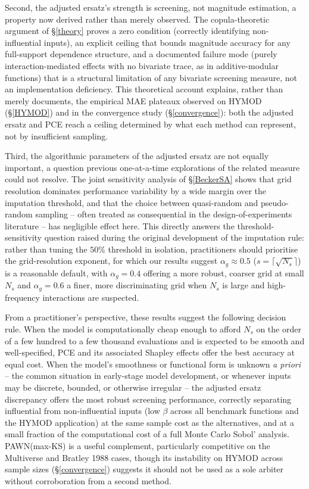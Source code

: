 \documentclass[12pt]{article}
\begin{document}
Second, the adjusted ersatz's strength is screening, not magnitude estimation, a property now derived rather than merely observed. The copula-theoretic argument of \S\ref{theory} proves a zero condition (correctly identifying non-influential inputs), an explicit ceiling that bounds magnitude accuracy for any full-support dependence structure, and a documented failure mode (purely interaction-mediated effects with no bivariate trace, as in additive-modular functions) that is a structural limitation of any bivariate screening measure, not an implementation deficiency. This theoretical account explains, rather than merely documents, the empirical MAE plateaux observed on HYMOD (\S\ref{HYMOD}) and in the convergence study (\S\ref{convergence}): both the adjusted ersatz and PCE reach a ceiling determined by what each method can represent, not by insufficient sampling.

Third, the algorithmic parameters of the adjusted ersatz are not equally important, a question previous one-at-a-time explorations of the related measure could not resolve. The joint sensitivity analysis of \S\ref{BeckerSA} shows that grid resolution dominates performance variability by a wide margin over the imputation threshold, and that the choice between quasi-random and pseudo-random sampling -- often treated as consequential in the design-of-experiments literature -- has negligible effect here. This directly answers the threshold-sensitivity question raised during the original development of the imputation rule: rather than tuning the $50\%$ threshold in isolation, practitioners should prioritise the grid-resolution exponent, for which our results suggest $\alpha_g\approx0.5$ ($s=\lceil\sqrt{N_s}\rceil$) is a reasonable default, with $\alpha_g=0.4$ offering a more robust, coarser grid at small $N_s$ and $\alpha_g=0.6$ a finer, more discriminating grid when $N_s$ is large and high-frequency interactions are suspected.

From a practitioner's perspective, these results suggest the following decision rule. When the model is computationally cheap enough to afford $N_s$ on the order of a few hundred to a few thousand evaluations and is expected to be smooth and well-specified, PCE and its associated Shapley effects offer the best accuracy at equal cost. When the model's smoothness or functional form is unknown \emph{a priori} -- the common situation in early-stage model development, or whenever inputs may be discrete, bounded, or otherwise irregular -- the adjusted ersatz discrepancy offers the most robust screening performance, correctly separating influential from non-influential inputs (low $\beta$ across all benchmark functions and the HYMOD application) at the same sample cost as the alternatives, and at a small fraction of the computational cost of a full Monte Carlo Sobol' analysis. PAWN(max-KS) is a useful complement, particularly competitive on the Multiverse and Bratley 1988 cases, though its instability on HYMOD across sample sizes (\S\ref{convergence}) suggests it should not be used as a sole arbiter without corroboration from a second method.
\end{document}
